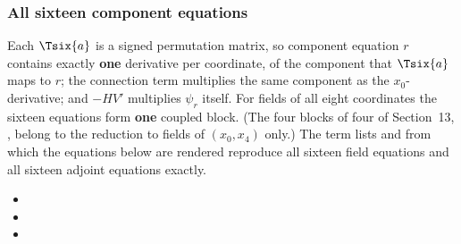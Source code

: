 \subsubsection{All sixteen component equations}
\label{sec:3.4.4}

Each $\Tsix{a}$ is a signed permutation matrix, so component equation $r$ contains exactly
\textbf{one} derivative per coordinate, of the component that $\Tsix{a}$ maps to $r$; the connection
term multiplies the same component as the $x_0$-derivative; and $-HV'$ multiplies $\psi_r$ itself.
For fields of all eight coordinates the sixteen equations form \textbf{one} coupled block. (The four
blocks of four of Section~13, , belong to the reduction to fields of $(x_0,x_4)$
only.) The term lists  and  from which the equations
below are rendered reproduce all sixteen field equations and all sixteen adjoint equations exactly.
\begin{itemize}
  \item {}
  \item {}
  \item {}
\end{itemize}

